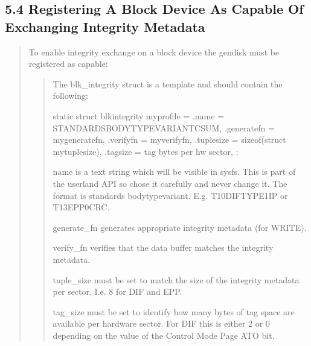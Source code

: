 \documentclass[a4paper,11pt,english]{sphinxmanual}
\begin{document}
\subsection{5.4 Registering A Block Device As Capable Of Exchanging Integrity Metadata}
\label{\detokenize{data-integrity:registering-a-block-device-as-capable-of-exchanging-integrity-metadata}}\begin{quote}

To enable integrity exchange on a block device the gendisk must be
registered as capable:

\begin{quote}

The blk\_integrity struct is a template and should contain the
following:

\begin{sphinxVerbatim}[commandchars=\\\{\}]
static struct blk\PYGZus{}integrity my\PYGZus{}profile = \PYGZob{}
    .name                   = \PYGZdq{}STANDARDSBODY\PYGZhy{}TYPE\PYGZhy{}VARIANT\PYGZhy{}CSUM\PYGZdq{},
    .generate\PYGZus{}fn            = my\PYGZus{}generate\PYGZus{}fn,
    .verify\PYGZus{}fn              = my\PYGZus{}verify\PYGZus{}fn,
    .tuple\PYGZus{}size             = sizeof(struct my\PYGZus{}tuple\PYGZus{}size),
    .tag\PYGZus{}size               = \PYGZlt{}tag bytes per hw sector\PYGZgt{},
\PYGZcb{};
\end{sphinxVerbatim}

\textquotesingle{}name\textquotesingle{} is a text string which will be visible in sysfs.  This is
part of the userland API so chose it carefully and never change
it.  The format is standards body\sphinxhyphen{}type\sphinxhyphen{}variant.
E.g. T10\sphinxhyphen{}DIF\sphinxhyphen{}TYPE1\sphinxhyphen{}IP or T13\sphinxhyphen{}EPP\sphinxhyphen{}0\sphinxhyphen{}CRC.

\textquotesingle{}generate\_fn\textquotesingle{} generates appropriate integrity metadata (for WRITE).

\textquotesingle{}verify\_fn\textquotesingle{} verifies that the data buffer matches the integrity
metadata.

\textquotesingle{}tuple\_size\textquotesingle{} must be set to match the size of the integrity
metadata per sector.  I.e. 8 for DIF and EPP.

\textquotesingle{}tag\_size\textquotesingle{} must be set to identify how many bytes of tag space
are available per hardware sector.  For DIF this is either 2 or
0 depending on the value of the Control Mode Page ATO bit.
\end{quote}
\end{quote}
\end{document}
